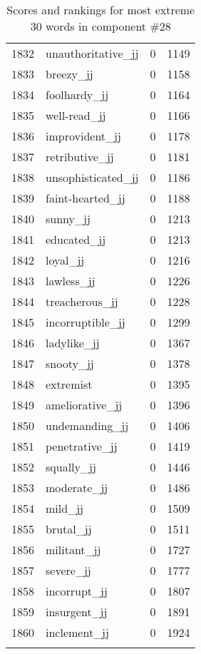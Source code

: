 \begin{longtable}[!htbp]{| rlr@{.}l |}
    1832 & unauthoritative\_jj & 0 & 1149 \\
    1833 & breezy\_jj & 0 & 1158 \\
    1834 & foolhardy\_jj & 0 & 1164 \\
    1835 & well-read\_jj & 0 & 1166 \\
    1836 & improvident\_jj & 0 & 1178 \\
    1837 & retributive\_jj & 0 & 1181 \\
    1838 & unsophisticated\_jj & 0 & 1186 \\
    1839 & faint-hearted\_jj & 0 & 1188 \\
    1840 & sunny\_jj & 0 & 1213 \\
    1841 & educated\_jj & 0 & 1213 \\
    1842 & loyal\_jj & 0 & 1216 \\
    1843 & lawless\_jj & 0 & 1226 \\
    1844 & treacherous\_jj & 0 & 1228 \\
    1845 & incorruptible\_jj & 0 & 1299 \\
    1846 & ladylike\_jj & 0 & 1367 \\
    1847 & snooty\_jj & 0 & 1378 \\
    1848 & extremist & 0 & 1395 \\
    1849 & ameliorative\_jj & 0 & 1396 \\
    1850 & undemanding\_jj & 0 & 1406 \\
    1851 & penetrative\_jj & 0 & 1419 \\
    1852 & squally\_jj & 0 & 1446 \\
    1853 & moderate\_jj & 0 & 1486 \\
    1854 & mild\_jj & 0 & 1509 \\
    1855 & brutal\_jj & 0 & 1511 \\
    1856 & militant\_jj & 0 & 1727 \\
    1857 & severe\_jj & 0 & 1777 \\
    1858 & incorrupt\_jj & 0 & 1807 \\
    1859 & insurgent\_jj & 0 & 1891 \\
    1860 & inclement\_jj & 0 & 1924 \\
    \hline
    \caption{Scores and rankings for most extreme 30 words in component \#28} \\
\end{longtable}
